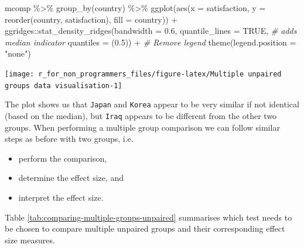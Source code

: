 \documentclass[
]{book}
\newenvironment{Shaded}{\begin{snugshade}}{\end{snugshade}}
\newcommand{\AttributeTok}[1]{\textcolor[rgb]{0.77,0.63,0.00}{#1}}
\newcommand{\CommentTok}[1]{\textcolor[rgb]{0.56,0.35,0.01}{\textit{#1}}}
\newcommand{\ConstantTok}[1]{\textcolor[rgb]{0.00,0.00,0.00}{#1}}
\newcommand{\FloatTok}[1]{\textcolor[rgb]{0.00,0.00,0.81}{#1}}
\newcommand{\FunctionTok}[1]{\textcolor[rgb]{0.00,0.00,0.00}{#1}}
\newcommand{\NormalTok}[1]{#1}
\newcommand{\SpecialCharTok}[1]{\textcolor[rgb]{0.00,0.00,0.00}{#1}}
\newcommand{\StringTok}[1]{\textcolor[rgb]{0.31,0.60,0.02}{#1}}
\begin{document}
\begin{Shaded}
\begin{Highlighting}[]
\NormalTok{mcomp }\SpecialCharTok{\%\textgreater{}\%}
  \FunctionTok{group\_by}\NormalTok{(country) }\SpecialCharTok{\%\textgreater{}\%}
  \FunctionTok{ggplot}\NormalTok{(}\FunctionTok{aes}\NormalTok{(}\AttributeTok{x =}\NormalTok{ satisfaction,}
             \AttributeTok{y =} \FunctionTok{reorder}\NormalTok{(country, satisfaction),}
             \AttributeTok{fill =}\NormalTok{ country)) }\SpecialCharTok{+}
\NormalTok{  ggridges}\SpecialCharTok{::}\FunctionTok{stat\_density\_ridges}\NormalTok{(}\AttributeTok{bandwidth =} \FloatTok{0.6}\NormalTok{,}
                                \AttributeTok{quantile\_lines =} \ConstantTok{TRUE}\NormalTok{,   }\CommentTok{\# adds median indicator}
                                \AttributeTok{quantiles =}\NormalTok{ (}\FloatTok{0.5}\NormalTok{)) }\SpecialCharTok{+}
  \CommentTok{\# Remove legend}
  \FunctionTok{theme}\NormalTok{(}\AttributeTok{legend.position =} \StringTok{"none"}\NormalTok{)}
\end{Highlighting}
\end{Shaded}

\begin{center}\texttt{[image: r\_for\_non\_programmers\_files/figure-latex/Multiple unpaired groups data visualisation-1]} \end{center}

The plot shows us that \texttt{Japan} and \texttt{Korea} appear to be very similar if not identical (based on the median), but \texttt{Iraq} appears to be different from the other two groups. When performing a multiple group comparison we can follow similar steps as before with two groups, i.e.

\begin{itemize}
\item
  perform the comparison,
\item
  determine the effect size, and
\item
  interpret the effect size.
\end{itemize}

Table \ref{tab:comparing-multiple-groups-unpaired} summarises which test needs to be chosen to compare multiple unpaired groups and their corresponding effect size measures.
\end{document}
